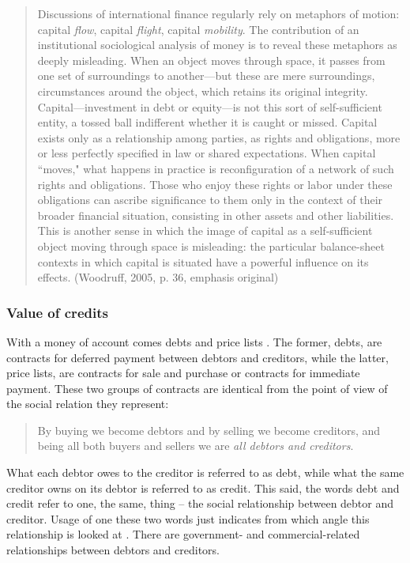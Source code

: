 \begin{quote}
 Discussions of international finance regularly rely on metaphors of
 motion: capital \textit{flow}, capital \textit{flight}, capital \textit{mobility}. The
 contribution of an institutional sociological analysis of money is to
 reveal these metaphors as deeply misleading. When an object moves
 through space, it passes from one set of surroundings to another---but
 these are mere surroundings, circumstances around the object, which
 retains its original integrity. Capital---investment in debt or
 equity---is not this sort of self-sufficient entity, a tossed ball
 indifferent whether it is caught or missed. Capital exists only as a
 relationship among parties, as rights and obligations, more or less
 perfectly specified in law or shared expectations. When capital
 ``moves," what happens in practice is reconfiguration of a network of
 such rights and obligations. Those who enjoy these rights or labor
 under these obligations can ascribe significance to them only in the
 context of their broader financial situation, consisting in other
 assets and other liabilities. This is another sense in which the image
 of capital as a self-sufficient object moving through space is
 misleading: the particular balance-sheet contexts in which capital is
 situated have a powerful influence on its effects. (Woodruff, 2005, p.
 36, emphasis original)
\end{quote}

\subsubsection{Value of credits}

With a money of account comes debts and price lists \citep[p.~150]{bell}.
The former, debts, are contracts for deferred payment between debtors
and creditors, while the latter, price lists, are contracts for sale and
purchase or contracts for immediate payment. These two groups of
contracts are identical from the point of view of the social relation
they represent:

\begin{quote}
 By buying we become debtors and by selling we become creditors, and
 being all both buyers and sellers we are \textit{all debtors and creditors}.~\citep{innes1913}
\end{quote}

What each debtor owes to the creditor is referred to as debt, while what
the same creditor owns on its debtor is referred to as credit. This
said, the words debt and credit refer to one, the same, thing -- the
social relationship between debtor and creditor. Usage of one these two
words just indicates from which angle this relationship is looked at
\citep{innes1913,wray2004}. There are government- and
commercial-related relationships between debtors and creditors.

